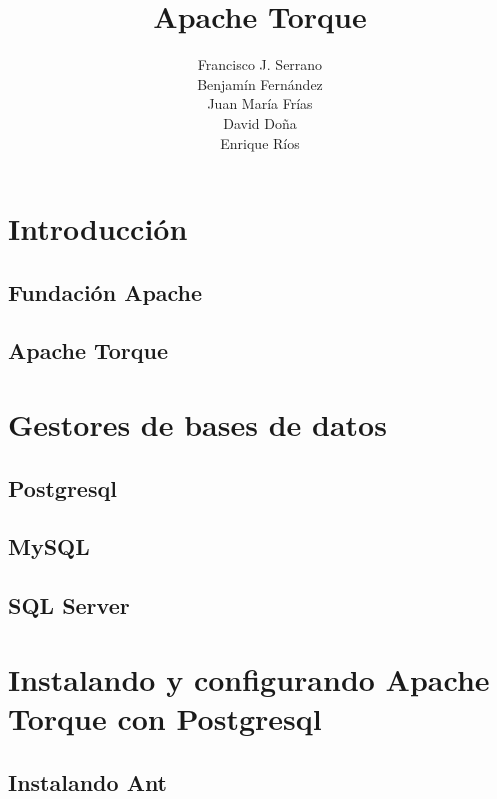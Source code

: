 \documentclass[12pt, oneside]{article}
\title{Apache Torque}
\author{
	Francisco J. Serrano\\
	Benjamín Fernández\\
	Juan María Frías\\
	David Doña\\
	Enrique Ríos
}
\begin{document}
\begin{titlepage}
	\maketitle
\end{titlepage}

\tableofcontents
\newpage

\section{Introducción}
	\subsection{Fundación Apache}
		

	\subsection{Apache Torque}
		

\section{Gestores de bases de datos}

	\subsection{Postgresql}
		

	\subsection{MySQL}
		
	
	\subsection{SQL Server}
		

\section{Instalando y configurando Apache Torque con Postgresql}
	

	\subsection{Instalando Ant}
		
\end{document}
